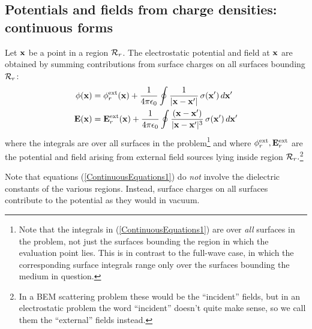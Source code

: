 \documentclass[letterpaper]{article}
\begin{document}
\subsection*{Potentials and fields from charge densities: 
             continuous forms} 

Let $\mathbf{x}$ be a point in a region $\mathcal{R}_r$. The electrostatic potential 
and field at $\mathbf{x}$ are obtained by summing contributions from
surface charges on all surfaces bounding $\mathcal{R}_r$: 
\begin{subequations}
\begin{align}
\phi(\mathbf{x}) 
&= \phi_r^{\hbox{\scriptsize{ext}}}(\mathbf{x}) 
  +\frac{1}{4\pi\epsilon_0} 
   \oint
   \frac{1}{|\mathbf{x} - \mathbf{x}^\prime|}
           \,\sigma(\mathbf{x}^\prime) \, d\mathbf{x}^\prime
\\
\mathbf{E}(\mathbf{x}) 
&= \mathbf{E}_r^{\hbox{\scriptsize{ext}}}(\mathbf{x})
  +\frac{1}{4\pi\epsilon_0}
   \oint
   \frac{(\mathbf{x}-\mathbf{x}^\prime)}
        {|\mathbf{x} - \mathbf{x}^\prime|^3}
        \,\sigma(\mathbf{x}^\prime)\,d\mathbf{x}^\prime
\end{align}
\label{ContinuousEquations1}
\end{subequations}
where the integrals are over all surfaces in the problem\footnote{Note
that the integrals in (\ref{ContinuousEquations1}) are over 
\textit{all} surfaces in the problem, not just the surfaces bounding 
the region in which the evaluation point lies. This is in contrast
to the full-wave case, in which the corresponding surface integrals
range only over the surfaces bounding the medium in question.}
and where $\phi_r^{\hbox{\scriptsize{ext}}},\mathbf{E}_r^{\hbox{\scriptsize{ext}}}$ are the potential
and field arising from external field sources lying inside
region $\mathcal{R}_r.$\footnote{In a BEM scattering problem these 
would be the ``incident'' fields, but in an electrostatic problem 
the word ``incident'' doesn't quite make sense, so we call them 
the ``external'' fields instead.} 

Note that equations (\ref{ContinuousEquations1}) do \textit{not}
involve the dielectric constants of the various regions. Instead,
surface charges on all surfaces contribute to the potential as
they would in vacuum. 
\end{document}
